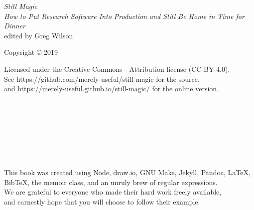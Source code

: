 \documentclass[10pt,statementpaper]{memoir}
\begin{document}
\pagestyle{empty}

{\begingroup
  \raggedleft
  \vspace*{\baselineskip}

  {\Huge\itshape Still Magic}\\[\baselineskip]

  {\large\itshape
    How to Put Research Software Into Production and Still Be Home in Time for Dinner
  }\\[0.2\textheight]

  {\large edited by Greg Wilson}\par

  \vfill

  {\large Copyright {\copyright} 2019}

  \vspace*{\baselineskip}


  \vspace*{\baselineskip}

  {\small
    Licensed under the Creative Commons - Attribution license (CC-BY-4.0).
    \\
    See https://github.com/merely-useful/still-magic for the source,\\
    and https://merely-useful.github.io/still-magic/ for the online version.
  }

\endgroup}

\newpage

\pagestyle{empty}

~

\newpage

\tableofcontents

\newpage
\listoffigures

\newpage
\pagestyle{empty}

~

\newpage
\listoffigures

\newpage
\pagestyle{empty}

~

\newpage
\listoftables

\newpage
\pagestyle{empty}

~

\newpage

\pagestyle{plain}



\cleartoverso
{\begingroup
  \raggedleft
  \vspace*{4\baselineskip}
  This book was created using Node, draw.io, GNU Make, Jekyll, Pandoc, LaTeX, BibTeX, the memoir class,
  and an unruly brew of regular expressions. \\
  We are grateful to everyone who made their hard work freely available, \\
  and earnestly hope that you will choose to follow their example.

\endgroup}
\end{document}
